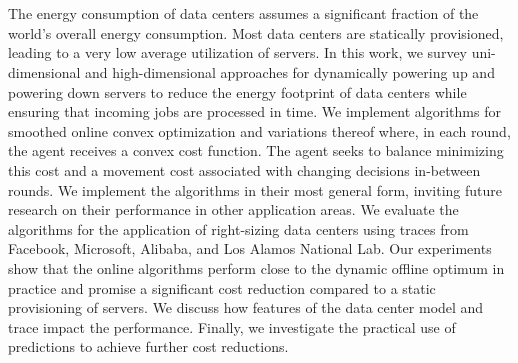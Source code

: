 \chapter{\abstractname}

The energy consumption of data centers assumes a significant fraction of the world's overall energy consumption. Most data centers are statically provisioned, leading to a very low average utilization of servers. In this work, we survey uni-dimensional and high-dimensional approaches for dynamically powering up and powering down servers to reduce the energy footprint of data centers while ensuring that incoming jobs are processed in time. We implement algorithms for smoothed online convex optimization and variations thereof where, in each round, the agent receives a convex cost function. The agent seeks to balance minimizing this cost and a movement cost associated with changing decisions in-between rounds. We implement the algorithms in their most general form, inviting future research on their performance in other application areas. We evaluate the algorithms for the application of right-sizing data centers using traces from Facebook, Microsoft, Alibaba, and Los Alamos National Lab. Our experiments show that the online algorithms perform close to the dynamic offline optimum in practice and promise a significant cost reduction compared to a static provisioning of servers. We discuss how features of the data center model and trace impact the performance. Finally, we investigate the practical use of predictions to achieve further cost reductions.